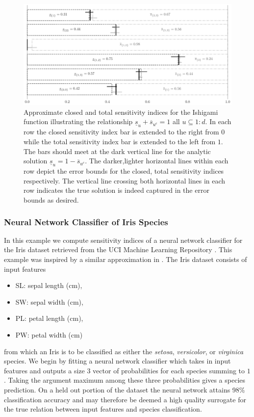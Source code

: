 \documentclass{article}[12pt]
\begin{document}
\begin{figure}[t]
    \centering
    \includegraphics[width=.8\textwidth]{figs/ishigami.pdf}
    \caption{Approximate closed and total sensitivity indices for the Ishigami function illustrating the relationship $\underline{s}_u + \overline{s}_{u^c} = 1$ all $u \subseteq 1:d$. In each row the closed sensitivity index bar is  extended to the right from $0$ while the total sensitivity index bar is extended to the left from $1$. The bars should meet at the dark vertical line for the  analytic solution $\underline{s}_u=1-\overline{s}_{u^c}$. The darker,lighter horizontal lines within each row depict the error bounds for the closed, total sensitivity indices respectively. The vertical line crossing both horizontal lines in each row indicates the true solution is indeed captured in the error bounds as desired.}
    \label{fig:ishigami}
\end{figure}

\subsubsection{Neural Network Classifier of Iris Species}

In this example we compute sensitivity indices of a neural network classifier for the Iris dataset retrieved from the UCI Machine Learning Repository \cite{uci_ml_repo}. This example was inspired by a similar approximation in \cite{hoyt2021efficient}. The Iris dataset consists of input features
\begin{itemize}
    \item SL: sepal length (cm),
    \item SW: sepal width (cm),
    \item PL: petal length (cm),
    \item PW: petal width (cm)
\end{itemize}
from which an Iris is to be classified as either the \emph{setosa}, \emph{versicolor}, or \emph{virginica} species. We begin by fitting a neural network classifier \cite{he2015delving} which takes in input features and outputs a size $3$ vector of probabilities for each species summing to $1$. Taking the argument maximum among these three probabilities gives a species prediction. On a held out portion of the dataset the neural network attains 98\% classification accuracy and may therefore be deemed a high quality surrogate for the true relation between input features and species classification. 
\end{document}
